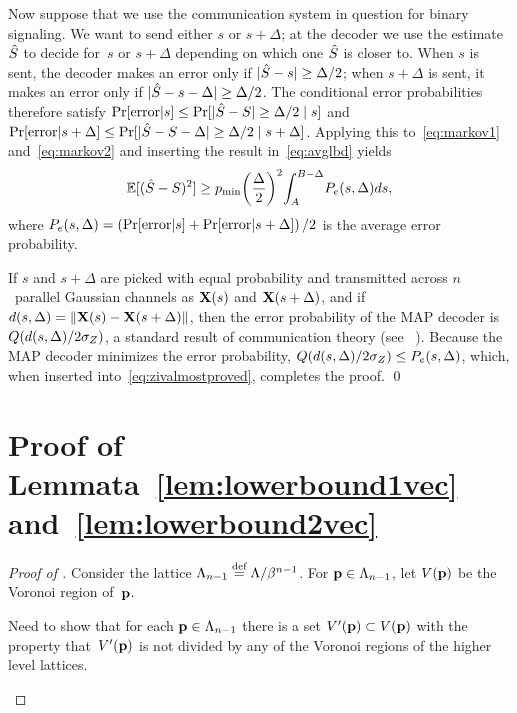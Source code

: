 \begin{subappendices}
  Now suppose that we use the communication system in question for binary
  signaling. We want to send either $s$ or $s+\Delta$; at the decoder we use the
  estimate~${\hat{S}}$ to decide for~$s$ or $s + \Delta$ depending on which one ${\hat{S}}$
  is closer to. When $s$ is sent, the decoder makes an error only if $|{\hat{S}} - s|
  \ge \Delta/2$; when $s + \Delta$ is sent, it makes an error only if $|{\hat{S}} - s
  - \Delta| \ge \Delta/2$. The conditional error probabilities therefore satisfy
  $\Pr[\text{error} | s] \le \Pr[|{\hat{S}} - S| \ge \Delta/2 \mid s]$ and
  $\Pr[\text{error} | s + \Delta] \le \Pr[|{\hat{S}} - S - \Delta| \ge \Delta/2 \mid s +
  \Delta]$. Applying this to~\eqref{eq:markov1} and~\eqref{eq:markov2} and
  inserting the result in~\eqref{eq:avglbd} yields
  \begin{equation}
    \label{eq:zivalmostproved}
    {\mathbb{E}[({\hat{S}}- S)^2]} \ge {p_{\min}} {\left(\frac{\Delta}{2}\right)^2} {\int_A^{B-\Delta}} P_e(s, \Delta) ds,
  \end{equation}
  where $P_e(s, \Delta) = \left(\Pr[\text{error}|s] + \Pr[\text{error}|s +
  \Delta] \right)/2$ is the average error probability.

  If $s$ and $s+\Delta$ are picked with equal probability and transmitted across
  $n$~parallel Gaussian channels as $\mathbf{X}(s)$ and $\mathbf{X}(s+\Delta)$, and if $d(s,
  \Delta) = \| \mathbf{X}(s) - \mathbf{X}(s + \Delta)\|$, then the error probability of the MAP
  decoder is $Q(d(s,\Delta) / 2 {\sigma_Z})$, a standard result of communication theory
  (see \eg~\cite[Section~4.5]{WozencraftJ1965}). Because the MAP decoder minimizes
  the error probability, $Q(d(s,\Delta)/2{\sigma_Z}) \le P_e(s,\Delta)$, which, when
  inserted into~\eqref{eq:zivalmostproved}, completes the proof. \hfill\qed


  \section{Proof of Lemmata~\ref{lem:lowerbound1vec}
  and~\ref{lem:lowerbound2vec}}

  \begin{proof}[Proof of ]
    Consider the lattice ${\Lambda_{n-1}} \stackrel{\text{def}}{=} \Lambda/\beta^{n-1}$. For $\mathbf{p} \in
    {\Lambda_{n-1}}$, let $V(\mathbf{p})$ be the Voronoi region of~$\mathbf{p}$.

    \begin{notebox}
      Need to show that for each $\mathbf{p} \in {\Lambda_{n-1}}$ there is a set $V'(\mathbf{p}) \subset
      V(\mathbf{p})$ with the property that~$V'(\mathbf{p})$ is not divided by any of the
      Voronoi regions of the higher level lattices.
    \end{notebox}


\end{proof}
\end{subappendices}
